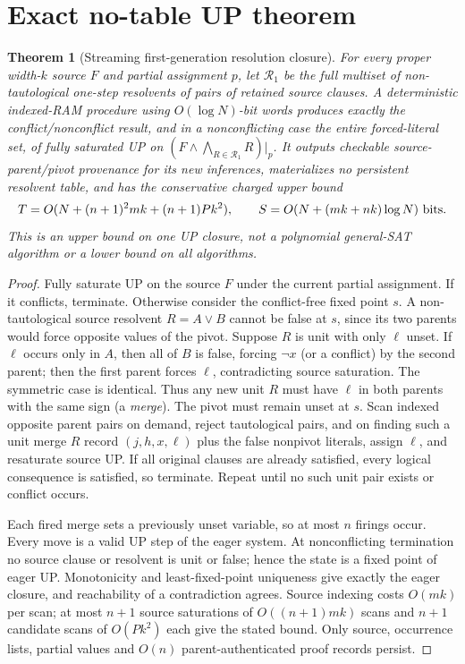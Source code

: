 \documentclass[11pt]{article}
\newtheorem{theorem}{Theorem}
\begin{document}
\section{Exact no-table UP theorem}
\begin{theorem}[Streaming first-generation resolution closure]\label{th:stream}
For every proper width-$k$ source $F$ and partial assignment $p$, let $\mathcal R_1$ be the full multiset of non-tautological one-step resolvents of pairs of retained source clauses. A deterministic indexed-RAM procedure using $O(\log N)$-bit words produces exactly the conflict/nonconflict result, and in a nonconflicting case the entire forced-literal set, of fully saturated UP on $(F\land\bigwedge_{R\in\mathcal R_1}R)|_p$. It outputs checkable source-parent/pivot provenance for its new inferences, materializes no persistent resolvent table, and has the conservative charged upper bound
\[
T=O(N+(n+1)^2mk+(n+1)Pk^2),\qquad
S=O(N+(mk+nk)\log N)\ {\rm bits}.
\]
This is an upper bound on \emph{one UP closure}, not a polynomial general-SAT algorithm or a lower bound on all algorithms.
\end{theorem}
\begin{proof}
Fully saturate UP on the source $F$ under the current partial assignment. If it conflicts, terminate. Otherwise consider the conflict-free fixed point $s$. A non-tautological source resolvent $R=A\lor B$ cannot be false at $s$, since its two parents would force opposite values of the pivot. Suppose $R$ is unit with only $\ell$ unset. If $\ell$ occurs only in $A$, then all of $B$ is false, forcing $\neg x$ (or a conflict) by the second parent; then the first parent forces $\ell$, contradicting source saturation. The symmetric case is identical. Thus any new unit $R$ must have $\ell$ in both parents with the same sign (a \emph{merge}). The pivot must remain unset at $s$. Scan indexed opposite parent pairs on demand, reject tautological pairs, and on finding such a unit merge $R$ record $(j,h,x,\ell)$ plus the false nonpivot literals, assign $\ell$, and resaturate source UP. If all original clauses are already satisfied, every logical consequence is satisfied, so terminate. Repeat until no such unit pair exists or conflict occurs.

Each fired merge sets a previously unset variable, so at most $n$ firings occur. Every move is a valid UP step of the eager system. At nonconflicting termination no source clause or resolvent is unit or false; hence the state is a fixed point of eager UP. Monotonicity and least-fixed-point uniqueness give exactly the eager closure, and reachability of a contradiction agrees. Source indexing costs $O(mk)$ per scan; at most $n+1$ source saturations of $O((n+1)mk)$ scans and $n+1$ candidate scans of $O(Pk^2)$ each give the stated bound. Only source, occurrence lists, partial values and $O(n)$ parent-authenticated proof records persist.
\end{proof}
\end{document}
